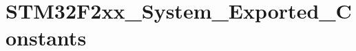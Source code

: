 \hypertarget{group___s_t_m32_f2xx___system___exported___constants}{\section{S\-T\-M32\-F2xx\-\_\-\-System\-\_\-\-Exported\-\_\-\-Constants}
\label{group___s_t_m32_f2xx___system___exported___constants}
}

